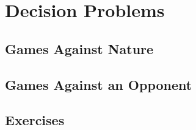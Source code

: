 \chapter{Decision Problems}

\section{Games Against Nature}

\section{Games Against an Opponent}

\section{Exercises}
